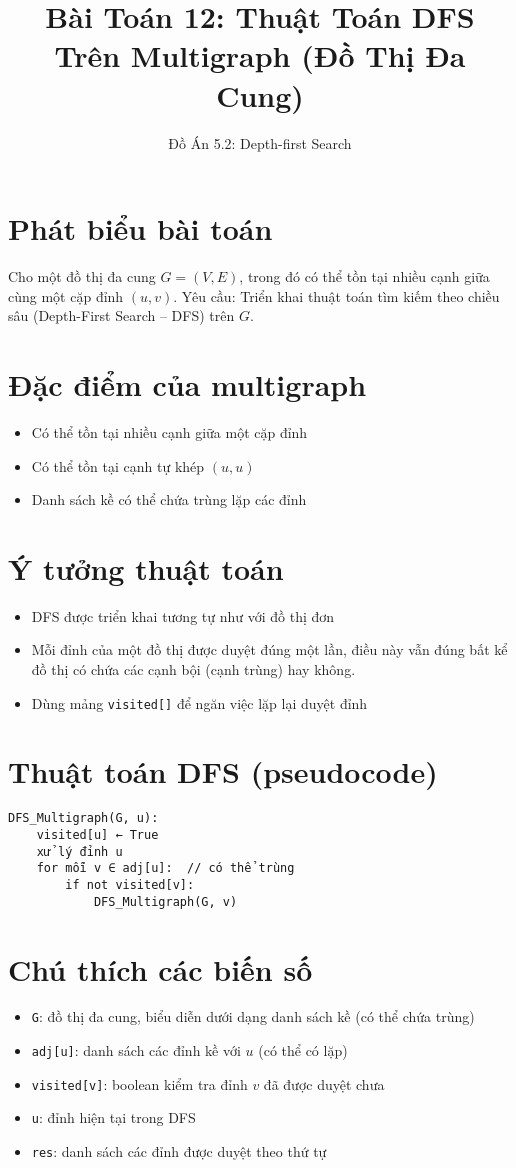 \documentclass[12pt]{article}
\title{Bài Toán 12: Thuật Toán DFS Trên Multigraph (Đồ Thị Đa Cung)}
\author{Đồ Án 5.2: Depth-first Search}
\date{}
\begin{document}
\maketitle

\section*{Phát biểu bài toán}
Cho một đồ thị đa cung $G = (V, E)$, trong đó có thể tồn tại nhiều cạnh giữa cùng một cặp đỉnh $(u, v)$.  
Yêu cầu: Triển khai thuật toán tìm kiếm theo chiều sâu (Depth-First Search – DFS) trên $G$.

\section*{Đặc điểm của multigraph}
\begin{itemize}
    \item Có thể tồn tại nhiều cạnh giữa một cặp đỉnh
    \item Có thể tồn tại cạnh tự khép $(u, u)$
    \item Danh sách kề có thể chứa trùng lặp các đỉnh
\end{itemize}

\section*{Ý tưởng thuật toán}
\begin{itemize}
    \item DFS được triển khai tương tự như với đồ thị đơn
    \item Mỗi đỉnh của một đồ thị được duyệt đúng một lần, điều này vẫn đúng bất kể đồ thị có chứa các cạnh bội (cạnh trùng) hay không.
    \item Dùng mảng \texttt{visited[]} để ngăn việc lặp lại duyệt đỉnh
\end{itemize}

\section*{Thuật toán DFS (pseudocode)}
\begin{verbatim}
DFS_Multigraph(G, u):
    visited[u] ← True
    xử lý đỉnh u
    for mỗi v ∈ adj[u]:  // có thể trùng
        if not visited[v]:
            DFS_Multigraph(G, v)
\end{verbatim}

\section*{Chú thích các biến số}
\begin{itemize}
    \item \texttt{G}: đồ thị đa cung, biểu diễn dưới dạng danh sách kề (có thể chứa trùng)
    \item \texttt{adj[u]}: danh sách các đỉnh kề với $u$ (có thể có lặp)
    \item \texttt{visited[v]}: boolean kiểm tra đỉnh $v$ đã được duyệt chưa
    \item \texttt{u}: đỉnh hiện tại trong DFS
    \item \texttt{res}: danh sách các đỉnh được duyệt theo thứ tự
\end{itemize}
\end{document}
